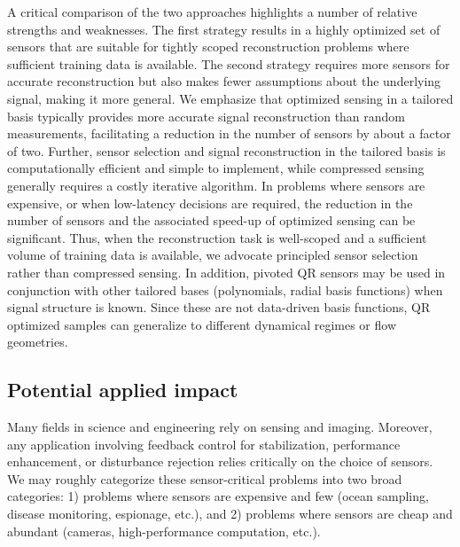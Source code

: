 \documentclass[letterpaper]{IEEEtran}
\begin{document}
A critical comparison of the two approaches highlights a number of relative strengths and weaknesses.  
The first strategy results in a highly optimized set of sensors that are suitable for tightly scoped reconstruction problems where sufficient training data is available.  
The second strategy requires more sensors for accurate reconstruction but also makes fewer assumptions about the underlying signal, making it more general.  
We emphasize that optimized sensing in a tailored basis typically provides more accurate signal reconstruction than random measurements, facilitating a reduction in the number of sensors by about a factor of two.  
Further, sensor selection and signal reconstruction in the tailored basis is computationally efficient and simple to implement, while compressed sensing generally requires a costly iterative algorithm.  
In problems where sensors are expensive, or when low-latency decisions are required, the reduction in the number of sensors and the associated speed-up of optimized sensing can be significant.  
Thus, when the reconstruction task is well-scoped and a sufficient volume of training data is available, we advocate principled sensor selection rather than compressed sensing.  
In addition, pivoted QR sensors may be used in conjunction with other tailored bases (polynomials, radial basis functions) when signal structure is known. Since these are not data-driven basis functions, QR optimized samples can generalize to different dynamical regimes or flow geometries.

\subsection{Potential applied impact}
Many fields in science and engineering rely on sensing and imaging.  
Moreover, any application involving feedback control for stabilization, performance enhancement, or disturbance rejection relies critically on the choice of sensors.  
We may roughly categorize these sensor-critical problems into two broad categories:  1) problems where sensors are expensive and few (ocean sampling, disease monitoring, espionage, etc.), and 2) problems where sensors are cheap and abundant (cameras, high-performance computation, etc.). 
 
\end{document}
